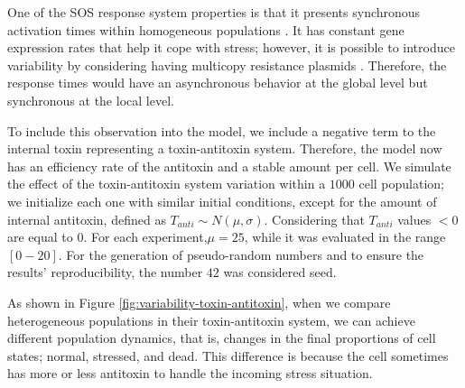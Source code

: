 \documentclass[a4paper, nobind]{templates/ociamthesis}
\begin{document}
One of the SOS response system properties is that it presents synchronous activation times within homogeneous populations \autocite{friedmanPreciseTemporalModulation2005}. It has constant gene expression rates that help it cope with stress; however, it is possible to introduce variability by considering having multicopy resistance plasmids \autocite{million-weaverMechanismsPlasmidSegregation2014}. Therefore, the response times would have an asynchronous behavior at the global level but synchronous at the local level.

To include this observation into the model, we include a negative term to the internal toxin representing a toxin-antitoxin system. Therefore, the model now has an efficiency rate of the antitoxin and a stable amount per cell. We simulate the effect of the toxin-antitoxin system variation within a \(1000\) cell population; we initialize each one with similar initial conditions, except for the amount of internal antitoxin, defined as \(T_{anti} \sim N(\mu, \sigma)\). Considering that \(T_{anti}\) values \(< 0\) are equal to \(0\). For each experiment,\(\mu = 25\), while it was evaluated in the range \([0-20]\). For the generation of pseudo-random numbers and to ensure the results' reproducibility, the number \(42\) was considered seed.

As shown in Figure \ref{fig:variability-toxin-antitoxin}, when we compare heterogeneous populations in their toxin-antitoxin system, we can achieve different population dynamics, that is, changes in the final proportions of cell states; normal, stressed, and dead. This difference is because the cell sometimes has more or less antitoxin to handle the incoming stress situation.
\end{document}
